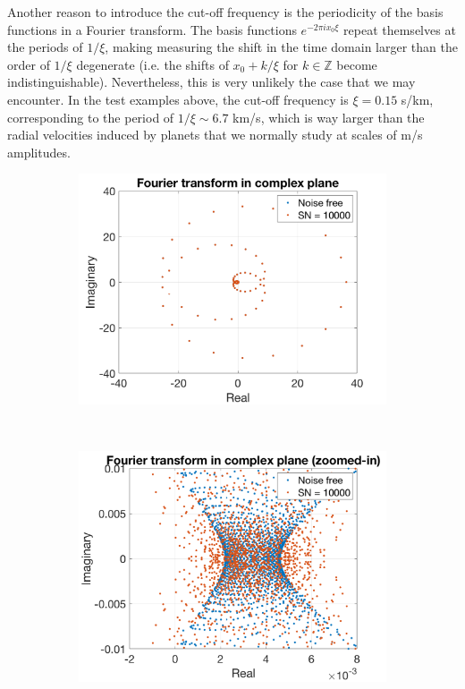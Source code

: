 Another reason to introduce the cut-off frequency is the periodicity of the basis functions in a Fourier transform. The basis functions $e^{-2 \pi ix_0 \xi}$ repeat themselves at the periods of $1/\xi$, making measuring the shift in the time domain larger than the order of $1/\xi$ degenerate (i.e. the shifts of $x_0+k/\xi$ for $k\in\mathbb{Z}$ become indistinguishable). Nevertheless, this is very unlikely the case that we may encounter. In the test examples above, the cut-off frequency is $\xi = 0.15$ s/km, corresponding to the period of $1/\xi\sim6.7$ km/s, which is way larger than the radial velocities induced by planets that we normally study at scales of m/s amplitudes. 

\begin{figure}[tbp]	
    \begin{subfigure}[b]{0.49\textwidth}
        \includegraphics[width=\textwidth]{./Figures/Methods/7-Phase_angle_in_complex_plane_1.png}
        \label{fig:FT_compelx_plane_1}
    \end{subfigure}
	~
    \begin{subfigure}[b]{0.49\textwidth}
        \includegraphics[width=\textwidth]{./Figures/Methods/7-Phase_angle_in_complex_plane_2.png}
        \label{fig:FT_compelx_plane_2}
    \end{subfigure}	
    

\end{figure}
